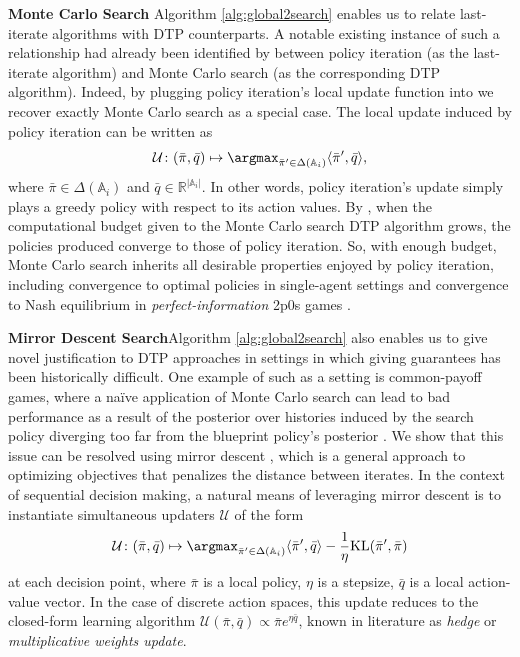 \documentclass{article} %
\theoremstyle{plain}
\theoremstyle{definition}
\theoremstyle{remark}
\begin{document}
\textbf{Monte Carlo Search}\quad
Algorithm \ref{alg:global2search} enables us to relate last-iterate algorithms with DTP counterparts.
A notable existing instance of such a relationship had already been identified by \citet{mcs} between policy iteration (as the last-iterate algorithm) and Monte Carlo search (as the corresponding DTP algorithm).
Indeed, by plugging policy iteration's local update function into  we recover exactly Monte Carlo search as a special case.
The local update induced by policy iteration can be written as
 \[\mathcal{U} \colon (\bar{\pi}, \bar{q}) \mapsto \argmax_{\bar{\pi}' \in \Delta(\mathbb{A}_i)} \langle \bar{\pi}', \bar{q} \rangle,\]
 where $\bar{\pi} \in \Delta(\mathbb{A}_i)$ and $\bar{q} \in \mathbb{R}^{|\mathbb{A}_i|}$.
In other words, policy iteration's update simply plays a greedy policy with respect to its action values.
By , when the computational budget given to the Monte Carlo search DTP algorithm grows, the policies produced converge to those of policy iteration. So, with enough budget, Monte Carlo search inherits all desirable properties enjoyed by policy iteration, including convergence to optimal policies in single-agent settings and convergence to Nash equilibrium in \emph{perfect-information} 2p0s games \citep{Littman96algorithmsfor}.

\textbf{Mirror Descent Search}\quad Algorithm \ref{alg:global2search} also enables us to give novel justification to DTP approaches in settings in which giving guarantees has been historically difficult.
One example of such as a setting is common-payoff games, where a na\"ive application of Monte Carlo search can lead to bad performance as a result of the posterior over histories induced by the search policy diverging too far from the blueprint policy's posterior \citep{bft}. 
We show that this issue can be resolved using mirror descent \citep{BECK2003167,nemirovski1983problem}, which is a general approach to optimizing objectives that penalizes the distance between iterates.
In the context of sequential decision making, a natural means of leveraging mirror descent is to instantiate simultaneous updaters $\mathcal{U}$ of the form 
\[\mathcal{U} \colon (\bar{\pi}, \bar{q}) \mapsto \argmax_{\bar{\pi}' \in \Delta(\mathbb{A}_i)} \langle \bar{\pi}', \bar{q} \rangle - \frac{1}{\eta} \text{KL}(\bar{\pi}', \bar{\pi})\]
at each decision point,
where $\bar{\pi}$ is a local policy, $\eta$ is a stepsize, $\bar{q}$ is a local action-value vector. In the case of discrete action spaces, this update reduces to the closed-form learning algorithm
$\mathcal{U}(\bar{\pi}, \bar{q}) \propto \bar{\pi} e^{\eta \bar{q}}$,
known in literature as \emph{hedge} or \emph{multiplicative weights update}.
\end{document}
